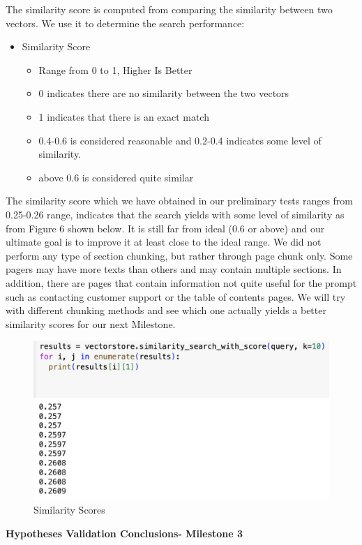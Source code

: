 \documentclass[conference]{IEEEtran}
\begin{document}
\begin{itemize}
    The similarity score is computed from comparing the similarity between two vectors. We use it to determine the search performance:
    \begin{itemize}
        \item Similarity Score
        \begin{itemize}
            \item Range from 0 to 1, Higher Is Better
            \item 0 indicates there are no similarity between the two vectors
            \item 1 indicates that there is an exact match
            \item 0.4-0.6 is considered reasonable and 0.2-0.4 indicates some level of similarity.
            \item above 0.6 is considered quite similar
        \end{itemize}
    \end{itemize}
    The similarity score which we have obtained in our preliminary tests ranges from 0.25-0.26 range, indicates that the search yields with some level of similarity as from Figure 6 shown below. It is still far from ideal (0.6 or above) and our ultimate goal is to improve it at least close to the ideal range.
    We did not perform any type of section chunking, but rather through page chunk only. Some pagers may have more texts than others and may contain multiple sections. In addition, there are pages that contain information not quite useful for the prompt such as contacting customer support or the table of contents pages. We will try with different chunking methods and see which one actually yields a better similarity scores for our next Milestone. 
    \begin{figure} [h!]
        \centering
        \includegraphics[width=0.5\linewidth]{Similarity.png}
        \caption{Similarity Scores}
        \label{fig:similar-label}
    \end{figure}
\end{itemize}

\textbf{Hypotheses Validation Conclusions- Milestone 3}
\end{document}
